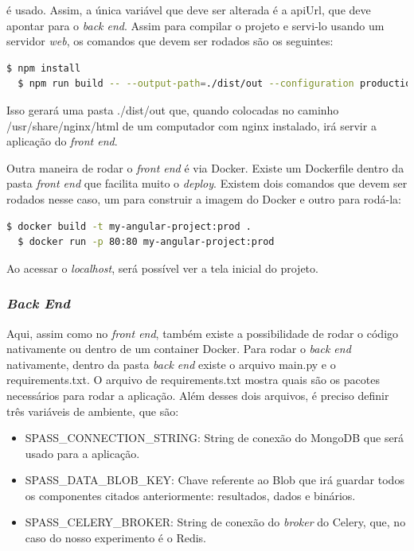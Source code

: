\documentclass[11pt,twoside]{article}
\begin{document}
é usado. Assim, a única variável que deve ser alterada é a apiUrl, que deve apontar para o \emph{back end}. Assim para compilar o projeto e servi-lo usando um servidor \emph{web}, os comandos que 
devem ser rodados são os seguintes: 

\begin{lstlisting}[language=bash]
  $ npm install 
  $ npm run build -- --output-path=./dist/out --configuration production
\end{lstlisting}

Isso gerará uma pasta ./dist/out que, quando colocadas no caminho /usr/share/nginx/html de um computador com nginx instalado, irá servir a aplicação do \emph{front end}.

Outra maneira de rodar o \emph{front end} é via Docker. Existe um Dockerfile dentro da pasta \emph{front end} que facilita muito o \emph{deploy}. Existem dois comandos que devem ser rodados nesse caso, um
para construir a imagem do Docker e outro para rodá-la:

\begin{lstlisting}[language=bash]
  $ docker build -t my-angular-project:prod .
  $ docker run -p 80:80 my-angular-project:prod
\end{lstlisting}

Ao acessar o \emph{localhost}, será possível ver a tela inicial do projeto.

\subsubsection{\emph{Back End}}

Aqui, assim como no \emph{front end}, também existe a possibilidade de rodar o código nativamente ou dentro de um container Docker. Para rodar o \emph{back end} nativamente, dentro da pasta \emph{back end}
existe o arquivo main.py e o requirements.txt. O arquivo de requirements.txt mostra quais são os pacotes necessários para rodar a aplicação. Além desses dois arquivos, é preciso definir três
variáveis de ambiente, que são:

\begin{itemize}
  \item SPASS\_CONNECTION\_STRING: String de conexão do MongoDB que será usado para a aplicação.
  \item SPASS\_DATA\_BLOB\_KEY: Chave referente ao Blob que irá guardar todos os componentes citados anteriormente: resultados, dados e binários.
  \item SPASS\_CELERY\_BROKER: String de conexão do \emph{broker} do Celery, que, no caso do nosso experimento é o Redis.
\end{itemize}
\end{document}
